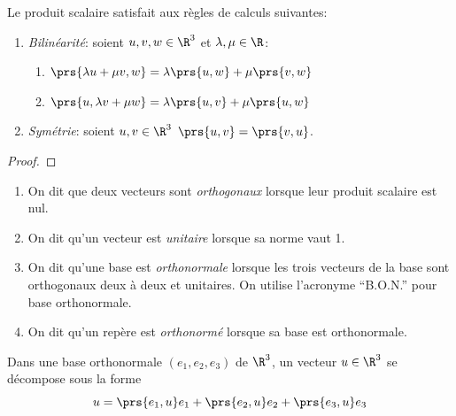 
\bigskip

\begin{proposition} Le produit scalaire satisfait aux règles de calculs suivantes:
	\begin{enumerate}
		\item \emph{Bilinéarité}: soient $u,v,w \in \R^3$ et $\lambda,\mu\in \R$:
			\begin{enumerate}
				\item  $\prs{\lambda u + \mu v, w} = \lambda \prs{u,w} + \mu \prs{v,w} $
				\item $\prs{u,\lambda v + \mu w} = \lambda \prs{u,v} + \mu \prs{u,w} $ 
			\end{enumerate}
		\item \emph{Symétrie}: soient $u,v\in\R^3$ $\prs{u,v} = \prs{v,u}$.
	\end{enumerate}
\end{proposition}

\begin{proof}
\pl{\rep{5cm}}	
\end{proof}

\sld{\vfill\pagebreak[5]}%

\begin{definition}
	\begin{enumerate}
		\item On dit que deux vecteurs sont \emph{orthogonaux} lorsque leur produit scalaire est nul.
		\item On dit qu'un vecteur est \emph{unitaire} lorsque sa norme vaut 1.
		\item On dit qu'une base est \emph{orthonormale} lorsque les trois vecteurs de la base sont orthogonaux deux à deux et unitaires. On utilise l'acronyme ``B.O.N.'' pour base orthonormale.
		\item On dit qu'un repère est \emph{orthonormé} lorsque sa base est orthonormale.
	\end{enumerate}
\end{definition}



\begin{proposition}
	Dans une base orthonormale $(e_1,e_2,e_3)$ de $\R^3$, un vecteur $u\in\R^3$ se décompose sous la forme\[
		u = \prs{e_1,u} e_1 + \prs{e_2,u} e_2 + \prs{e_3,u} e_3
	\]
\end{proposition}

